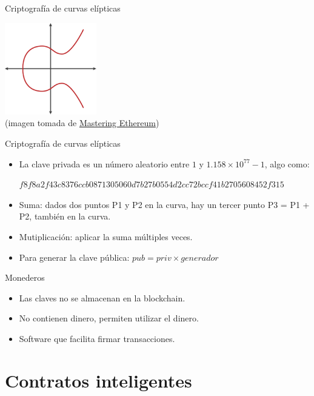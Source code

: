 \documentclass[10pt]{beamer}
\begin{document}
\begin{frame}{Criptografía de curvas elípticas}
  \begin{center}
    \includegraphics[height=4cm]{images/simple_elliptic_curve.png}
    \\ (imagen tomada de \href{https://github.com/ethereumbook/ethereumbook}{Mastering Ethereum})
  \end{center}
\end{frame}

\begin{frame}{Criptografía de curvas elípticas}
  \begin{itemize}
    \item La clave privada es un número aleatorio entre $1$ y $1.158 \times 10^{77} - 1$, algo como: \begin{tiny}$f8f8a2f43c8376ccb0871305060d7b27b0554d2cc72bccf41b2705608452f315$\end{tiny}
    \item Suma: dados dos puntos P1 y P2 en la curva, hay un tercer punto P3 = P1 + P2, también en la curva.
    \item Mutiplicación: aplicar la suma múltiples veces.
    \item Para generar la clave pública: $pub = priv \times generador$
  \end{itemize}
\end{frame}

\begin{frame}{Monederos}
  \begin{itemize}
    \item Las claves no se almacenan en la blockchain.
    \item No contienen dinero, permiten utilizar el dinero.
    \item Software que facilita firmar transacciones.
  \end{itemize}
\end{frame}

\section{Contratos inteligentes}
\end{document}
